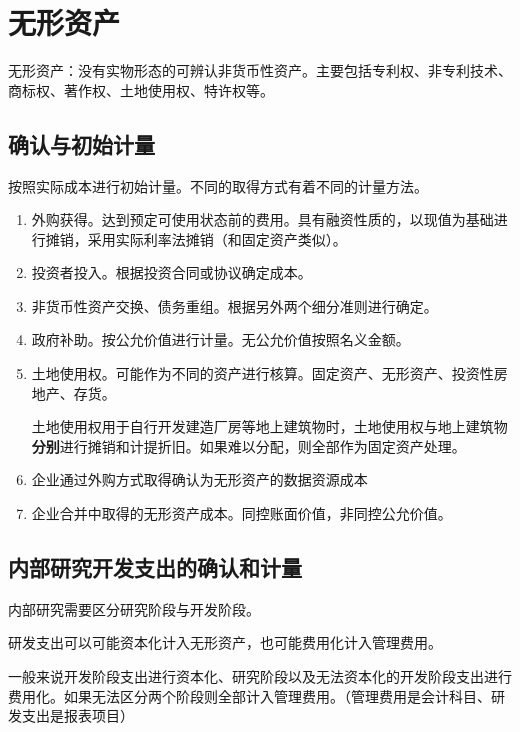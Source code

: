 \documentclass[UTF8,12pt]{ctexart}
\numberwithin{equation}{section} %
\numberwithin{figure}{section}
\numberwithin{table}{section}
\begin{document}
	
	
	\newpage
	\section{无形资产}
	
	无形资产：没有实物形态的可辨认非货币性资产。主要包括专利权、非专利技术、商标权、著作权、土地使用权、特许权等。
	
	\subsection{确认与初始计量}
	
	按照实际成本进行初始计量。不同的取得方式有着不同的计量方法。
	\begin{enumerate}
		\item 外购获得。达到预定可使用状态前的费用。具有融资性质的，以现值为基础进行摊销，采用实际利率法摊销（和固定资产类似）。
		
		\item 投资者投入。根据投资合同或协议确定成本。
		
		\item 非货币性资产交换、债务重组。根据另外两个细分准则进行确定。
		
		\item 政府补助。按公允价值进行计量。无公允价值按照名义金额。
		
		\item 土地使用权。可能作为不同的资产进行核算。固定资产、无形资产、投资性房地产、存货。
		
		土地使用权用于自行开发建造厂房等地上建筑物时，土地使用权与地上建筑物\textbf{分别}进行摊销和计提折旧。如果难以分配，则全部作为固定资产处理。
		
		\item 企业通过外购方式取得确认为无形资产的数据资源成本
		
		\item 企业合并中取得的无形资产成本。同控账面价值，非同控公允价值。
	\end{enumerate}
	
	\subsection{内部研究开发支出的确认和计量}
	内部研究需要区分研究阶段与开发阶段。
	
	研发支出可以可能资本化计入无形资产，也可能费用化计入管理费用。
	
	一般来说开发阶段支出进行资本化、研究阶段以及无法资本化的开发阶段支出进行费用化。如果无法区分两个阶段则全部计入管理费用。（管理费用是会计科目、研发支出是报表项目）
	
\end{document}
